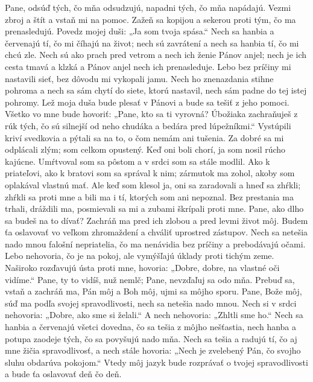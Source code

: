 Pane, odsúď tých, čo mňa odsudzujú,
napadni tých, čo mňa napádajú.
\versseparator
Vezmi zbroj a štít
a vstaň mi na pomoc.
\versseparator
Zažeň sa kopijou a sekerou
proti tým, čo ma prenasledujú.
Povedz mojej duši: „Ja som tvoja spása.“
\versseparator
Nech sa hanbia a červenajú tí,
čo mi číhajú na život;
\versseparator
nech sú zavrátení a nech sa hanbia tí,
čo mi chcú zle.
\versseparator
Nech sú ako prach pred vetrom
a nech ich ženie Pánov anjel;
\versseparator
nech je ich cesta tmavá a klzká
a Pánov anjel nech ich prenasleduje.
\versseparator
Lebo bez príčiny mi nastavili sieť,
bez dôvodu mi vykopali jamu.
\versseparator
Nech ho znenazdania stihne pohroma
a nech sa sám chytí do siete, ktorú nastavil,
nech sám padne do tej istej pohromy.
\versseparator
Lež moja duša bude plesať v Pánovi
a bude sa tešiť z jeho pomoci.
\versseparator
Všetko vo mne bude hovoriť:
„Pane, kto sa ti vyrovná?
\versseparator
Úbožiaka zachraňuješ z rúk tých, čo sú silnejší od neho
chudáka a bedára pred lúpežníkmi.“
\versseparator
Vystúpili kriví svedkovia
a pýtali sa na to, o čom nemám ani tušenia.
\versseparator
Za dobré sa mi odplácali zlým;
som celkom opustený.
\versseparator
Keď oni boli chorí,
ja som nosil rúcho kajúcne.
\versseparator
Umŕtvoval som sa pôstom
a v srdci som sa stále modlil.
\versseparator
Ako k priateľovi, ako k bratovi som sa správal k nim;
zármutok ma zohol, akoby som oplakával vlastnú mať.
\versseparator
Ale keď som klesol ja, oni sa zaradovali a hneď sa zhŕkli;
zhŕkli sa proti mne a bili ma i tí, ktorých som ani nepoznal.
\versseparator
Bez prestania ma trhali,
dráždili ma, posmievali sa mi
a zubami škrípali proti mne.
\versseparator
Pane, ako dlho sa budeš na to dívať?
Zachráň ma pred ich zlobou
a pred levmi život môj.
\versseparator
Budem ťa oslavovať vo veľkom zhromaždení
a chváliť uprostred zástupov.
\versseparator
Nech sa netešia nado mnou falošní nepriatelia,
čo ma nenávidia bez príčiny a prebodávajú očami.
\versseparator
Lebo nehovoria, čo je na pokoj,
ale vymýšľajú úklady proti tichým zeme.
\versseparator
Naširoko rozďavujú ústa proti mne,
hovoria: „Dobre, dobre, na vlastné oči vidíme.“
\versseparator
Pane, ty to vidíš, nuž nemlč;
Pane, nevzďaľuj sa odo mňa.
\versseparator
Prebuď sa, vstaň a zachráň ma,
Pán môj a Boh môj, ujmi sa môjho sporu.
\versseparator
Pane, Bože môj, súď ma podľa svojej spravodlivosti,
nech sa netešia nado mnou.
\versseparator
Nech si v srdci nehovoria:
„Dobre, ako sme si želali.“
A nech nehovoria: „Zhltli sme ho.“
\versseparator
Nech sa hanbia a červenajú všetci dovedna,
čo sa tešia z môjho nešťastia,
\versseparator
nech hanba a potupa zaodeje tých,
čo sa povyšujú nado mňa.
\versseparator
Nech sa tešia a radujú tí, čo aj mne žičia spravodlivosť,
a nech stále hovoria: „Nech je zvelebený Pán,
čo svojho sluhu obdarúva pokojom.“
\versseparator
Vtedy môj jazyk bude rozprávať o tvojej spravodlivosti
a bude ťa oslavovať deň čo deň.